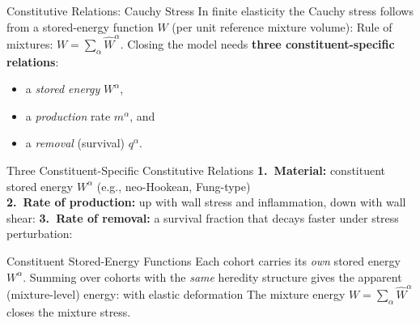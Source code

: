 \begin{frame}[t]{Constitutive Relations: Cauchy Stress}
  In finite elasticity the Cauchy stress follows from a stored-energy function
  $W$ (per unit reference mixture volume):
  Rule of mixtures: $W=\sum_{\alpha}\hat{W}^{\alpha}$. Closing the model needs
  \textbf{three constituent-specific relations}:
  \begin{itemize}
    \item a \emph{stored energy} $W^{\alpha}$,
    \item a \emph{production} rate $m^{\alpha}$, and
    \item a \emph{removal} (survival) $q^{\alpha}$.
  \end{itemize}
\end{frame}

\begin{frame}[t]{Three Constituent-Specific Constitutive Relations}
  \textbf{1.\ Material:} constituent stored energy $W^{\alpha}$ (e.g., neo-Hookean, Fung-type)\\
  \textbf{2.\ Rate of production:} up with wall stress and inflammation, down
  with wall shear:
  \textbf{3.\ Rate of removal:} a survival fraction that decays faster under
  stress perturbation:
\end{frame}

\begin{frame}[t]{Constituent Stored-Energy Functions}
  Each cohort carries its \emph{own} stored energy $W^{\alpha}$. Summing over cohorts with the \emph{same} heredity structure gives the apparent
  (mixture-level) energy:
  with elastic deformation 
  The mixture energy $W=\sum_{\alpha}\hat{W}^{\alpha}$ closes the mixture stress.
\end{frame}

